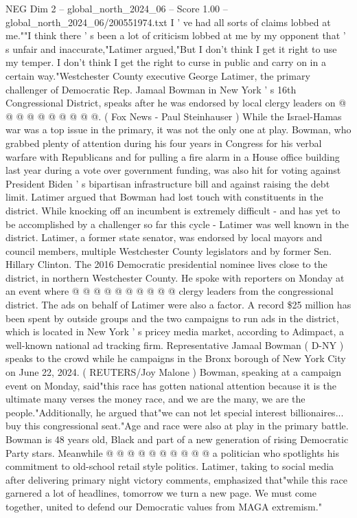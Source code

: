 \begin{textsample}{NEG Dim 2 – global\_north\_2024\_06 – Score 1.00 – global\_north\_2024\_06/200551974.txt}
I ' ve had all sorts of claims lobbed at me.""I think there ' s been a lot of criticism lobbed at me by my opponent that ' s unfair and inaccurate,"Latimer argued,"But I don't think I get it right to use my temper.
I don't think I get the right to curse in public and carry on in a certain way."Westchester County executive George Latimer, the primary challenger of Democratic Rep.
Jamaal Bowman in New York ' s 16th Congressional District, speaks after he was endorsed by local clergy leaders on @ @ @ @ @ @ @ @ @ @. ( Fox News - Paul Steinhauser ) While the Israel-Hamas war was a top issue in the primary, it was not the only one at play.
Bowman, who grabbed plenty of attention during his four years in Congress for his verbal warfare with Republicans and for pulling a fire alarm in a House office building last year during a vote over government funding, was also hit for voting against President Biden ' s bipartisan infrastructure bill and against raising the debt limit.
Latimer argued that Bowman had lost touch with constituents in the district.
While knocking off an incumbent is extremely difficult - and has yet to be accomplished by a challenger so far this cycle - Latimer was well known in the district.
Latimer, a former state senator, was endorsed by local mayors and council members, multiple Westchester County legislators and by former Sen.
Hillary Clinton.
The 2016 Democratic presidential nominee lives close to the district, in northern Westchester County.
He spoke with reporters on Monday at an event where @ @ @ @ @ @ @ @ @ @ clergy leaders from the congressional district.
The ads on behalf of Latimer were also a factor.
A record \$25 million has been spent by outside groups and the two campaigns to run ads in the district, which is located in New York ' s pricey media market, according to Adimpact, a well-known national ad tracking firm.
Representative Jamaal Bowman ( D-NY ) speaks to the crowd while he campaigns in the Bronx borough of New York City on June 22, 2024. ( REUTERS/Joy Malone ) Bowman, speaking at a campaign event on Monday, said"this race has gotten national attention because it is the ultimate many verses the money race, and we are the many, we are the people."Additionally, he argued that"we can not let special interest billionaires... buy this congressional seat."Age and race were also at play in the primary battle.
Bowman is 48 years old, Black and part of a new generation of rising Democratic Party stars.
Meanwhile @ @ @ @ @ @ @ @ @ @ a politician who spotlights his commitment to old-school retail style politics.
Latimer, taking to social media after delivering primary night victory comments, emphasized that"while this race garnered a lot of headlines, tomorrow we turn a new page.
We must come together, united to defend our Democratic values from MAGA extremism."

\end{textsample}
